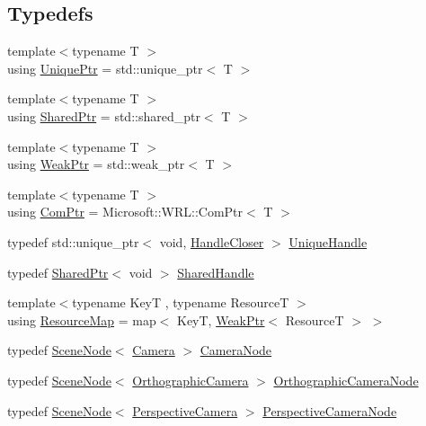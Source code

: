 \subsection*{Typedefs}
\begin{DoxyCompactItemize}
\item 
{\footnotesize template$<$typename T $>$ }\\using \hyperlink{namespacemage_a8c307fbcc33bce9b7f2aa4c26c3b95cf}{Unique\+Ptr} = std\+::unique\+\_\+ptr$<$ T $>$
\item 
{\footnotesize template$<$typename T $>$ }\\using \hyperlink{namespacemage_a1e01ae66713838a7a67d30e44c67703e}{Shared\+Ptr} = std\+::shared\+\_\+ptr$<$ T $>$
\item 
{\footnotesize template$<$typename T $>$ }\\using \hyperlink{namespacemage_aa159a63c0d58464bdf32dfe419dd5dc1}{Weak\+Ptr} = std\+::weak\+\_\+ptr$<$ T $>$
\item 
{\footnotesize template$<$typename T $>$ }\\using \hyperlink{namespacemage_ae74f374780900893caa5555d1031fd79}{Com\+Ptr} = Microsoft\+::\+W\+R\+L\+::\+Com\+Ptr$<$ T $>$
\item 
typedef std\+::unique\+\_\+ptr$<$ void, \hyperlink{structmage_1_1_handle_closer}{Handle\+Closer} $>$ \hyperlink{namespacemage_a284e84e551a05d4fc6c957985b2de3ed}{Unique\+Handle}
\item 
typedef \hyperlink{namespacemage_a1e01ae66713838a7a67d30e44c67703e}{Shared\+Ptr}$<$ void $>$ \hyperlink{namespacemage_ab892828913d6129acf71e0cec60467e5}{Shared\+Handle}
\item 
{\footnotesize template$<$typename KeyT , typename ResourceT $>$ }\\using \hyperlink{namespacemage_a0b0a087ad59dd4aa0b4b538d8caec216}{Resource\+Map} = map$<$ KeyT, \hyperlink{namespacemage_aa159a63c0d58464bdf32dfe419dd5dc1}{Weak\+Ptr}$<$ ResourceT $>$ $>$
\item 
typedef \hyperlink{classmage_1_1_scene_node}{Scene\+Node}$<$ \hyperlink{classmage_1_1_camera}{Camera} $>$ \hyperlink{namespacemage_a66d89b8744111e4827547a8996fc8ad8}{Camera\+Node}
\item 
typedef \hyperlink{classmage_1_1_scene_node}{Scene\+Node}$<$ \hyperlink{classmage_1_1_orthographic_camera}{Orthographic\+Camera} $>$ \hyperlink{namespacemage_ab4bde438cc5dd644b0092500df32a83e}{Orthographic\+Camera\+Node}
\item 
typedef \hyperlink{classmage_1_1_scene_node}{Scene\+Node}$<$ \hyperlink{classmage_1_1_perspective_camera}{Perspective\+Camera} $>$ \hyperlink{namespacemage_a4542f24699be53c2f30040ce575155a7}{Perspective\+Camera\+Node}

\end{DoxyCompactItemize}
